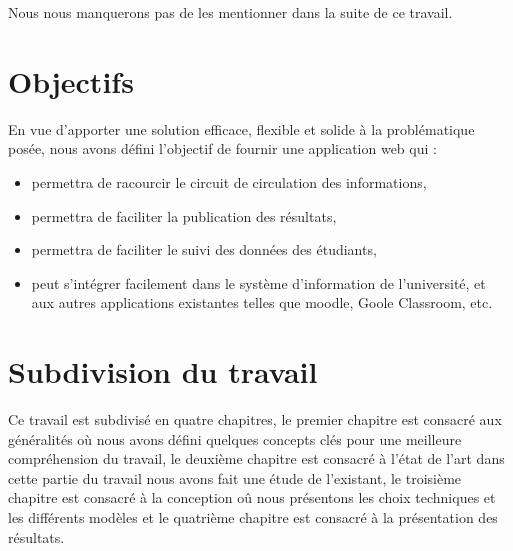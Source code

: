 Nous nous manquerons pas de les mentionner dans la suite de ce travail.
\section{Objectifs}\label{sec:objectifs}
En vue d'apporter une solution efficace, flexible et solide à la problématique posée, nous avons
défini l'objectif de fournir une application web qui :
\begin{itemize}
    \item permettra de racourcir le circuit de circulation des informations,
    \item permettra de faciliter la publication des résultats,
    \item permettra de faciliter le suivi des données des étudiants,
    \item peut s'intégrer facilement dans le système d'information de l'université, et aux autres applications existantes telles que moodle, Goole Classroom, etc.
\end{itemize}

\section{Subdivision du travail}\label{sec:subdivision-du-travail}
Ce travail est subdivisé en quatre chapitres, le premier chapitre est consacré aux généralités où
nous avons défini quelques concepts clés pour une meilleure compréhension du travail,
le deuxième chapitre est consacré à l'état de l'art dans cette partie du travail nous avons fait une étude de l'existant,
le troisième chapitre est consacré à la conception o\^u nous présentons les choix techniques et les différents modèles et
le quatrième chapitre est consacré à la présentation des résultats.